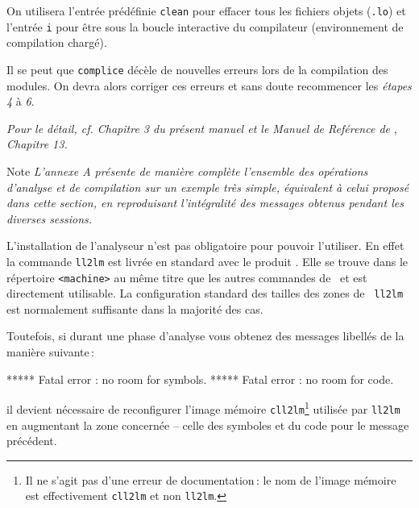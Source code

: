 On utilisera l'entr\'{e}e pr\'{e}d\'{e}finie {\tt clean} pour effacer tous les
fichiers objets ({\tt .lo}) et l'entr\'{e}e {\tt i} pour \^{e}tre sous la
boucle interactive du compilateur (environnement de compilation
charg\'{e}).

Il se peut que {\tt complice} d\'{e}c\`{e}le de nouvelles erreurs lors de la
compilation des modules. On devra alors corriger ces erreurs et sans
doute recommencer les {\em \'{e}tapes 4} \`{a} {\em 6}.


{\em Pour le d\'{e}tail, cf. Chapitre 3 du pr\'{e}sent manuel et le Manuel
de Ref\'{e}rence de} \LeLisp, {\em Chapitre 13.}


\bigskip

\begin{Side}{Note}
{\em L'annexe A pr\'{e}sente de mani\`{e}re compl\`{e}te l'ensemble des
op\'{e}rations d'analyse et de compilation sur un exemple tr\`{e}s simple,
\'{e}quivalent \`{a} celui propos\'{e} dans cette section,
en reproduisant l'int\'{e}gralit\'{e} des messages obtenus pendant 
les diverses sessions.}
\end{Side}




L'installation de l'analyseur n'est pas obligatoire pour pouvoir
l'utiliser. En effet la commande {\tt ll2lm} est livr\'{e}e 
en standard avec le produit \LeLisp. 
Elle se trouve dans le r\'{e}pertoire {\tt <machine>} au m\^{e}me
titre que les autres commandes de \LeLisp\ et est directement
utilisable. La configuration standard des tailles des zones de {\tt
ll2lm} est normalement suffisante dans la majorit\'{e} des cas. 

Toutefois, si durant une phase d'analyse vous obtenez des messages
libell\'{e}s de la mani\`{e}re suivante\,:

\begin{Code*}
***** Fatal error : no room for symbols.
***** Fatal error : no room for code.
\end{Code*}

il devient n\'{e}cessaire de reconfigurer l'image m\'{e}moire 
{\tt cll2lm}\footnote{Il ne s'agit pas
d'une erreur de documentation\,: le nom de l'image m\'{e}moire est
effectivement {\tt cll2lm} et non {\tt ll2lm}.}
utilis\'{e}e par {\tt ll2lm} en augmentant la zone concern\'{e}e -- celle 
des symboles et du code pour le message pr\'{e}c\'{e}dent.

